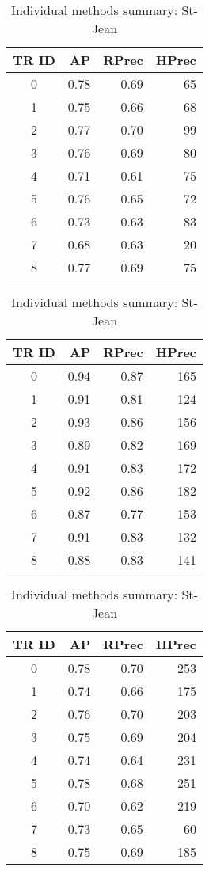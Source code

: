 \begin{table}[H]
  \centering
  \caption{Individual methods summary: St-Jean}
  \label{tab:rls_st_jean}

  \begin{tabular}{c r r r}
    \toprule
    TR ID & AP & RPrec & HPrec \\
    \midrule
    0 & 0.78 & 0.69 & 65 \\
    1 & 0.75 & 0.66 & 68 \\
    2 & 0.77 & 0.70 & 99 \\
    3 & 0.76 & 0.69 & 80 \\
    4 & 0.71 & 0.61 & 75 \\
    5 & 0.76 & 0.65 & 72 \\
    6 & 0.73 & 0.63 & 83 \\
    7 & 0.68 & 0.63 & 20 \\
    8 & 0.77 & 0.69 & 75 \\
    \bottomrule
  \end{tabular}

  \vspace{0.5cm}

  \begin{tabular}{c r r r}
    \toprule
    TR ID & AP & RPrec & HPrec \\
    \midrule
    0 & 0.94 & 0.87 & 165 \\
    1 & 0.91 & 0.81 & 124 \\
    2 & 0.93 & 0.86 & 156 \\
    3 & 0.89 & 0.82 & 169 \\
    4 & 0.91 & 0.83 & 172 \\
    5 & 0.92 & 0.86 & 182 \\
    6 & 0.87 & 0.77 & 153 \\
    7 & 0.91 & 0.83 & 132 \\
    8 & 0.88 & 0.83 & 141 \\
    \bottomrule
  \end{tabular}

  \vspace{0.5cm}

  \begin{tabular}{c r r r}
    \toprule
    TR ID & AP & RPrec & HPrec \\
    \midrule
    0 & 0.78 & 0.70 & 253 \\
    1 & 0.74 & 0.66 & 175 \\
    2 & 0.76 & 0.70 & 203 \\
    3 & 0.75 & 0.69 & 204 \\
    4 & 0.74 & 0.64 & 231 \\
    5 & 0.78 & 0.68 & 251 \\
    6 & 0.70 & 0.62 & 219 \\
    7 & 0.73 & 0.65 &  60 \\
    8 & 0.75 & 0.69 & 185 \\
    \bottomrule
  \end{tabular}
\end{table}

\onecolumn
